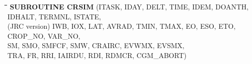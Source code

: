 \bigskip
\bigskip
\bigskip
\nwln
\begin{tabbing}
\hspace{1.27cm}\=\hspace{1.27cm}\=\hspace{1.27cm}\=\hspace{1.27cm}\=%
\hspace{1.27cm}\=\hspace{1.27cm}\=\hspace{1.27cm}\=\hspace{1.27cm}\=%
\hspace{1.27cm}\=\hspace{1.27cm}\=\kill
{\bf SUBROUTINE CRSIM}\> \> \> (ITASK, IDAY, DELT, TIME, IDEM, DOANTH, IDHALT, TERMNL, ISTATE,\\
(JRC version) \> \> \>  IWB, IOX, LAT, AVRAD, TMIN, TMAX, EO, ESO, ETO, CROP\_NO, VAR\_NO,\\
\>\> \>  SM, SMO, SMFCF, SMW, CRAIRC, EVWMX, EVSMX,\\
 \>\> \>  TRA, FR, RRI, IAIRDU, RDI, RDMCR, CGM\_ABORT)
\end{tabbing}

